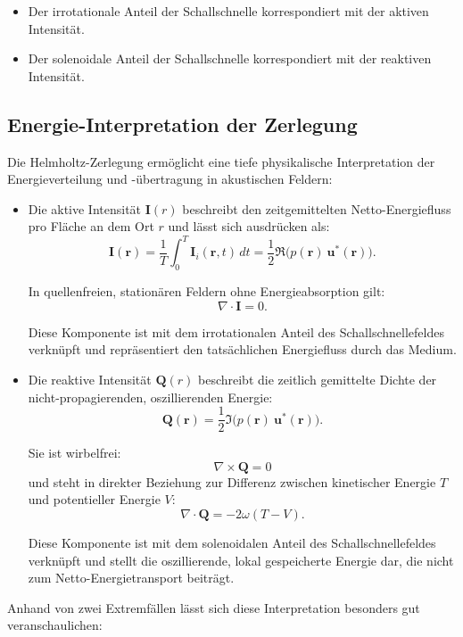 \begin{itemize}
\item
Der irrotationale Anteil der Schallschnelle korrespondiert mit der
aktiven Intensität.
\item
Der solenoidale Anteil der Schallschnelle korrespondiert mit der
reaktiven Intensität.
\end{itemize}

\subsection{Energie-Interpretation der Zerlegung
\label{helmholtz:Energie_Interpretation}}
Die Helmholtz-Zerlegung ermöglicht eine tiefe physikalische
Interpretation der Energieverteilung und -übertragung in akustischen
%
%
Feldern:
\begin{itemize}
\item
Die aktive Intensität $\boldsymbol{I}(r)$ beschreibt den zeitgemittelten
Netto-Energiefluss pro Fläche an dem Ort $r$ und lässt sich ausdrücken
als:
\begin{equation}
\boldsymbol{I}(\boldsymbol{r})
=
\frac{1}{T}\int_0^T \boldsymbol{I}_i(\boldsymbol{r},t)\,dt
=
\frac{1}{2}\Re\bigl( p(\boldsymbol{r})~\boldsymbol{u}^*(\boldsymbol{r})\bigr).
\end{equation}
 
In quellenfreien, stationären Feldern ohne Energieabsorption gilt:
\begin{equation}
\nabla \cdot \boldsymbol{I}
=
0.
\end{equation}
 
Diese Komponente ist mit dem irrotationalen Anteil des Schallschnellefeldes verknüpft und repräsentiert den tatsächlichen Energiefluss durch das Medium.
 
\item Die reaktive Intensität $\boldsymbol{Q}(r)$ beschreibt die zeitlich gemittelte Dichte der nicht-pro\-pa\-gie\-ren\-den, oszillierenden Energie:
%
\begin{equation}
\boldsymbol{Q}(\boldsymbol{r})
=
\frac{1}{2}\Im\bigl(p(\boldsymbol{r})~\boldsymbol{u}^*(\boldsymbol{r})\bigr).
\end{equation}
 
Sie ist wirbelfrei:
\begin{equation}
\nabla \times \boldsymbol{Q}
=
0
\end{equation}
und steht in direkter Beziehung zur Differenz zwischen kinetischer
Energie $T$ und potentieller Energie $V$:
\begin{equation}
\nabla \cdot \boldsymbol{Q}
=
-2 \omega (T-V).
\end{equation}
 
Diese Komponente ist mit dem solenoidalen Anteil des Schallschnellefeldes verknüpft und stellt die oszillierende, lokal gespeicherte Energie dar, die nicht zum Netto-Energietransport beiträgt.
\end{itemize}
Anhand von zwei Extremfällen lässt sich diese Interpretation besonders gut veranschaulichen:

